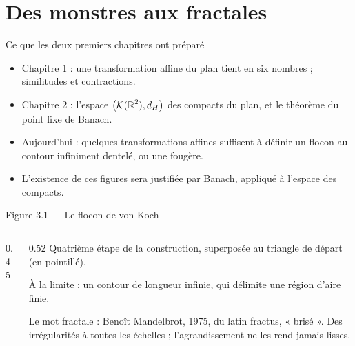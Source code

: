 \section{Des monstres aux fractales}

\begin{frame}{Ce que les deux premiers chapitres ont préparé}
  \small
  \begin{itemize}
    \item Chapitre 1 : une transformation affine du plan tient en six
      nombres ; similitudes et contractions.
    \item Chapitre 2 : l'espace $\big(\mathcal{K}(\operatorname{\mathbb{R}}^2),d_H\big)$ des
      compacts du plan, et le théorème du point fixe de Banach.
    \item Aujourd'hui : quelques transformations affines suffisent à
      définir un flocon au contour infiniment dentelé, ou une fougère.
    \item L'existence de ces figures sera justifiée par Banach,
      appliqué à l'espace des compacts.
  \end{itemize}
\end{frame}

\begin{frame}{Figure 3.1 --- Le flocon de von Koch}
  \begin{columns}[c]
    \begin{column}{0.45\textwidth}
    \end{column}
    \begin{column}{0.52\textwidth}
      \small
      Quatrième étape de la construction, superposée au triangle de
      départ (en pointillé).
      \vspace{6pt}

      À la limite : un contour de longueur infinie, qui délimite une
      région d'aire finie.
      \vspace{6pt}

      Le mot fractale : Benoît Mandelbrot, 1975, du latin fractus,
      « brisé ». Des irrégularités à toutes les échelles ;
      l'agrandissement ne les rend jamais lisses.
    \end{column}
  \end{columns}
\end{frame}


